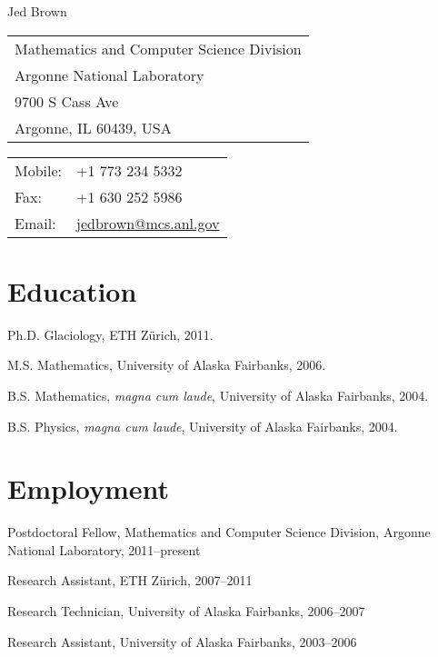 \documentclass[10pt,letterpaper]{article}
\def\name{Jed Brown}
\renewenvironment{itemize}{
  \begin{list}{}{
    \setlength{\leftmargin}{1.5em}
    \setlength{\itemsep}{0.25em}
    \setlength{\parskip}{0pt}
    \setlength{\parsep}{0.25em}
  }
}{
  \end{list}
}
\begin{document}
{\LARGE \name}


\bigskip

\begin{minipage}[t]{0.5\textwidth}
  \begin{tabular}{l}
  Mathematics and Computer Science Division \\
  Argonne National Laboratory \\
  9700 S Cass Ave \\
  Argonne, IL 60439, USA
\end{tabular}
\end{minipage}
\begin{minipage}[t]{0.5\textwidth}
  \begin{tabular}{ll}
    Mobile: & +1 773 234 5332 \\
    Fax: & +1 630 252 5986 \\
    Email: & \url{jedbrown@mcs.anl.gov}
  \end{tabular}
\end{minipage}

\section*{Education}

\begin{itemize}
\item Ph.D. Glaciology, ETH Z\"urich, 2011.
\item M.S. Mathematics, University of Alaska Fairbanks, 2006.
\item B.S. Mathematics, {\it magna cum laude}, University of Alaska Fairbanks, 2004.
\item B.S. Physics, {\it magna cum laude}, University of Alaska Fairbanks, 2004.
\end{itemize}

\section*{Employment}
\begin{itemize}
\item Postdoctoral Fellow, Mathematics and Computer Science Division, Argonne National Laboratory, 2011--present
\item Research Assistant, ETH Z\"urich, 2007--2011
\item Research Technician, University of Alaska Fairbanks, 2006--2007
\item Research Assistant, University of Alaska Fairbanks, 2003--2006
\end{itemize}
\end{document}
